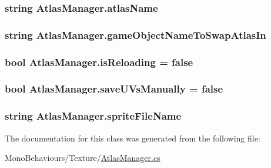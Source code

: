 \subsubsection[{\texorpdfstring{atlas\+Name}{atlasName}}]{\setlength{\rightskip}{0pt plus 5cm}string Atlas\+Manager.\+atlas\+Name}\hypertarget{class_atlas_manager_abfe0df51b5287870b5440a1d9bd95c18}{}\label{class_atlas_manager_abfe0df51b5287870b5440a1d9bd95c18}
\subsubsection[{\texorpdfstring{game\+Object\+Name\+To\+Swap\+Atlas\+In}{gameObjectNameToSwapAtlasIn}}]{\setlength{\rightskip}{0pt plus 5cm}string Atlas\+Manager.\+game\+Object\+Name\+To\+Swap\+Atlas\+In}\hypertarget{class_atlas_manager_a9694d5b0e0d64837f2edf83b239c1ebb}{}\label{class_atlas_manager_a9694d5b0e0d64837f2edf83b239c1ebb}
\subsubsection[{\texorpdfstring{is\+Reloading}{isReloading}}]{\setlength{\rightskip}{0pt plus 5cm}bool Atlas\+Manager.\+is\+Reloading = false}\hypertarget{class_atlas_manager_af2781dfa3f3eff5a3df743360c57d906}{}\label{class_atlas_manager_af2781dfa3f3eff5a3df743360c57d906}
\subsubsection[{\texorpdfstring{save\+U\+Vs\+Manually}{saveUVsManually}}]{\setlength{\rightskip}{0pt plus 5cm}bool Atlas\+Manager.\+save\+U\+Vs\+Manually = false}\hypertarget{class_atlas_manager_af7d6e4efd53d48ccce79e6d89eb44950}{}\label{class_atlas_manager_af7d6e4efd53d48ccce79e6d89eb44950}
\subsubsection[{\texorpdfstring{sprite\+File\+Name}{spriteFileName}}]{\setlength{\rightskip}{0pt plus 5cm}string Atlas\+Manager.\+sprite\+File\+Name}\hypertarget{class_atlas_manager_aeab505443bd56004509c957c6a5f9031}{}\label{class_atlas_manager_aeab505443bd56004509c957c6a5f9031}


The documentation for this class was generated from the following file\+:\begin{DoxyCompactItemize}
\item 
Mono\+Behaviours/\+Texture/\hyperlink{_atlas_manager_8cs}{Atlas\+Manager.\+cs}\end{DoxyCompactItemize}
